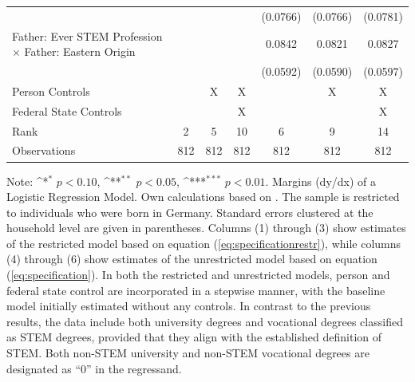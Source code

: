 \documentclass[a4paper, oneside, hyperfootnotes = false]{article}
\def\sym#1{\ifmmode^{#1}\else\(^{#1}\)\fi}
\begin{document}
{\begin{landscape}
\begin{table}[ht]
\begin{center}
{\begin{tabular}{l*{6}{c}}
					&                     &                     &                     &    (0.0766)         &    (0.0766)         &    (0.0781)         \\
					\addlinespace
					Father: Ever STEM Profession $\times$ Father: Eastern Origin&                     &                     &                     &      0.0842         &      0.0821         &      0.0827         \\
					&                     &                     &                     &    (0.0592)         &    (0.0590)         &    (0.0597)         \\
					\midrule
					Person Controls & & X  & X & & X & X \\
					Federal State Controls & & & X & & & X \\
					Rank                &      2         &      5         &     10         &      6         &      9         &     14         \\
					Observations &    812         &    812         &    812         &    812         &    812         &   812         \\
					\bottomrule
			\end{tabular}}
			
			\vspace{2mm}
			
			\parbox{15cm}{
				\linespread{1}\footnotesize Note: \sym{*} \(p<0.10\), \sym{**} \(p<0.05\), \sym{***} \(p<0.01\). Margins (dy/dx) of a Logistic Regression Model. Own calculations based on \cite{SOEP2023}. The sample is restricted to individuals who were born in Germany. Standard errors clustered at the household level are given in parentheses. Columns (1) through (3) show estimates of the restricted model based on equation (\ref{eq:specificationrestr}), while columns (4) through (6) show estimates of the unrestricted model based on equation (\ref{eq:specification}). In both the restricted and unrestricted models, person and federal state control are incorporated in a stepwise manner, with the baseline model initially estimated without any controls. In contrast to the previous results, the data include both university degrees and vocational degrees classified as STEM degrees, provided that they align with the established definition of STEM. Both non-STEM university and non-STEM vocational degrees are designated as ``0'' in the regressand.}
			
		\end{center}
	\end{table}
\end{landscape}

}
\end{document}
